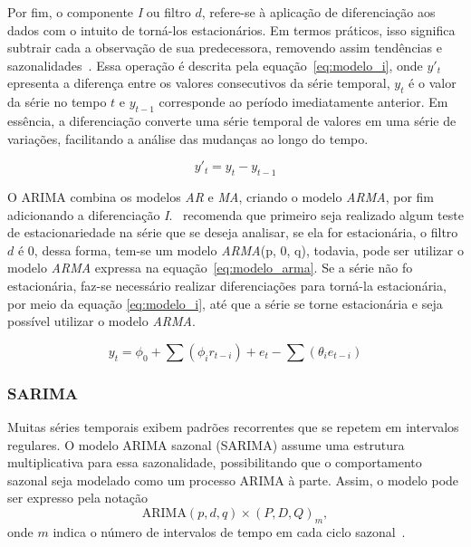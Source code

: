             Por fim, o componente \emph{I} ou filtro \(d\), refere-se à aplicação de diferenciação aos dados 
            com o intuito de torná-los estacionários. Em termos práticos, isso significa subtrair cada a
            observação de sua predecessora, removendo assim tendências e sazonalidades~\cite{nielsen2021analise,correa2024}. 
            Essa operação é descrita pela equação~\eqref{eq:modelo_i}, onde \(y'_t\) epresenta a diferença 
            entre os valores consecutivos da série temporal, \(y_t\) é o valor da série no tempo \(t\) e \(y_{t-1}\)
            corresponde ao período imediatamente anterior. Em essência, a diferenciação converte uma série 
            temporal de valores em uma série de variações, facilitando a análise das mudanças ao longo do 
            tempo.
            
            \begin{equation}
                y'_t = y_t - y_{t-1}
                \label{eq:modelo_i}
            \end{equation}  

            O ARIMA combina os modelos \emph{AR} e \emph{MA}, criando o modelo \emph{ARMA}, por fim adicionando 
            a diferenciação \emph{I}.~ recomenda que primeiro seja realizado algum teste
            de estacionariedade na série que se deseja analisar, se ela for estacionária, o filtro \(d\) é 0,
            dessa forma, tem-se um modelo \emph{ARMA}(p, 0, q), todavia, pode ser utilizar o modelo \emph{ARMA}
            expressa na equação~\eqref{eq:modelo_arma}. Se a série não fo estacionária, faz-se necessário realizar
            diferenciações para torná-la estacionária, por meio da equação \eqref{eq:modelo_i}, até que a série
            se torne estacionária e seja possível utilizar o modelo \emph{ARMA}.

            \begin{equation}
                y_t = \phi_0 + \sum (\phi_i r_{t-i}) + e_t - \sum (\theta_i e_{t-i}) 
                \label{eq:modelo_arma}
            \end{equation}
        
        \subsubsection{SARIMA}
            Muitas séries temporais exibem padrões recorrentes que se repetem em intervalos regulares. O modelo 
            ARIMA sazonal (SARIMA) assume uma estrutura multiplicativa para essa sazonalidade, possibilitando 
            que o comportamento sazonal seja modelado como um processo ARIMA à parte. Assim, o modelo pode ser 
            expresso pela notação
            \[
            \text{ARIMA}(p,d,q) \times (P,D,Q)_m,
            \]
            onde \( m \) indica o número de intervalos de tempo em cada ciclo sazonal~\cite{nielsen2021analise}.

